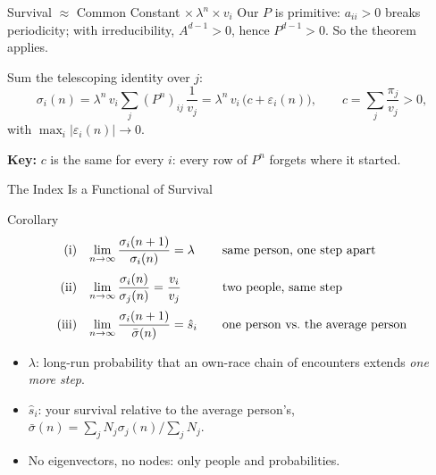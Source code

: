 \documentclass[aspectratio=169,10pt]{beamer}
\begin{document}
\begin{frame}[shrink=0]{Survival $\approx$ Common Constant $\times\, \lambda^n \times v_i$}
Our $P$ is primitive: $a_{ii} > 0$ breaks periodicity; with
irreducibility, $A^{d-1} > 0$, hence $P^{d-1} > 0$. So the theorem applies.
 
\vspace{0.2cm}
Sum the telescoping identity over $j$:
\[
\sigma_i(n) = \lambda^n\, v_i \sum_j (P^n)_{ij}\,\frac{1}{v_j}
= \lambda^n\, v_i\,\big(c + \varepsilon_i(n)\big),
\qquad c = \sum_j \frac{\pi_j}{v_j} > 0,
\]
with $\max_i |\varepsilon_i(n)| \to 0$.
 
\vspace{0.1cm}
\textbf{Key:} $c$ is the \alert{same for every $i$}: every row of $P^n$
forgets where it started.
\end{frame}
 
\begin{frame}[shrink=0]{The Index Is a Functional of Survival}
\begin{block}{Corollary}
\[
\begin{array}{r@{\quad}l@{\qquad}l}
\text{(i)} &
\displaystyle\lim_{n\to\infty} \frac{\sigma_i(n+1)}{\sigma_i(n)} = \lambda &
\text{same person, one step apart}\\[12pt]
\text{(ii)} &
\displaystyle\lim_{n\to\infty} \frac{\sigma_i(n)}{\sigma_j(n)} = \frac{v_i}{v_j} &
\text{two people, same step}\\[12pt]
\text{(iii)} &
\displaystyle\lim_{n\to\infty} \frac{\sigma_i(n+1)}{\bar\sigma(n)} = \hat s_i &
\text{one person vs.\ the average person}
\end{array}
\]
\end{block}
\begin{itemize}
    \item $\lambda$: long-run probability that an own-race chain of
    encounters extends \emph{one more step}.
    \item $\hat s_i$: your survival relative to the \alert{average person's},
    $\bar\sigma(n) = \sum_j N_j \sigma_j(n) \big/ \sum_j N_j$.
    \item No eigenvectors, no nodes: only people and probabilities.
\end{itemize}
\end{frame}
 
\end{document}
